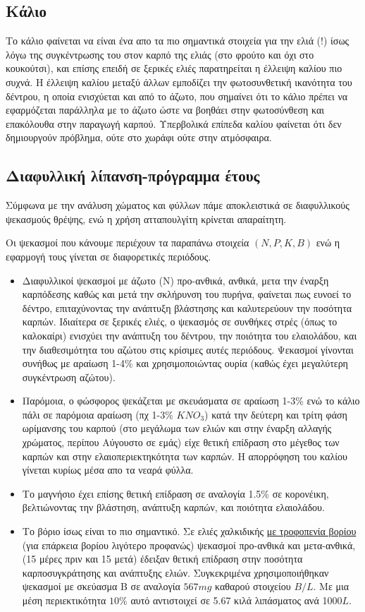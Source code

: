 \documentclass[12pt,a4paper]{article}
\begin{document}
\subsection{Κάλιο}
Το κάλιο φαίνεται να είναι ένα απο τα πιο σημαντικά στοιχεία για την ελιά (!) ίσως λόγω της συγκέντρωσης του στον καρπό της ελιάς (στο φρούτο και όχι στο κουκούτσι), και επίσης επειδή σε ξερικές ελιές παρατηρείται η έλλειψη καλίου πιο συχνά. Η έλλειψη καλίου μεταξύ άλλων εμποδίζει την φωτοσυνθετική ικανότητα του δέντρου, η οποία ενισχύεται και από το άζωτο, που σημαίνει ότι το κάλιο πρέπει να εφαρμόζεται παράλληλα με το άζωτο ώστε να βοηθάει στην φωτοσύνθεση και επακόλουθα στην παραγωγή καρπού. Υπερβολικά επίπεδα καλίου φαίνεται ότι δεν δημιουργούν πρόβλημα, ούτε στο χωράφι ούτε στην ατμόσφαιρα.     


\subsection{Διαφυλλική λίπανση-πρόγραμμα έτους}
Σύμφωνα με την ανάλυση χώματος και φύλλων πάμε αποκλειστικά σε διαφυλλικούς ψεκασμούς θρέψης, ενώ η χρήση ατταπουλγίτη κρίνεται απαραίτητη. 

Οι ψεκασμοί που κάνουμε περιέχουν τα παραπάνω στοιχεία $(Ν, P, K, B)$ ενώ η εφαρμογή τους γίνεται σε διαφορετικές περιόδους.


\begin{itemize}
	\item  Διαφυλλικοί ψεκασμοί με άζωτο (Ν) προ-ανθικά, ανθικά, μετα την έναρξη καρπόδεσης καθώς και μετά την σκλήρυνση του πυρήνα, φαίνεται πως ευνοεί το δέντρο, επιταχύνοντας την ανάπτυξη βλάστησης και καλυτερεύουν την ποσότητα καρπών. Ιδιαίτερα σε ξερικές ελιές, ο ψεκασμός σε συνθήκες στρές (όπως το καλοκαίρι) ενισχύει την ανάπτυξη του δέντρου, την ποιότητα του ελαιολάδου, και την διαθεσιμότητα του αζώτου στις κρίσιμες αυτές περιόδους. Ψεκασμοί γίνονται συνήθως με αραίωση 1-4\% και χρησιμοποιώντας ουρία (καθώς έχει μεγαλύτερη συγκέντρωση αζώτου).
	\item Παρόμοια, ο φώσφορος ψεκάζεται με σκευάσματα σε αραίωση 1-3\% ενώ το κάλιο πάλι σε παρόμοια αραίωση (πχ 1-3\% $KNO_3$) κατά την δεύτερη και τρίτη φάση ωρίμανσης του καρπού (στο μεγάλωμα των ελιών και στην έναρξη αλλαγής χρώματος, περίπου Αύγουστο σε εμάς) είχε θετική επίδραση στο μέγεθος των καρπών και στην ελαιοπεριεκτηκότητα των καρπών. Η απορρόφηση του καλίου γίνεται κυρίως μέσα απο τα νεαρά φύλλα. 
	\item  Το μαγνήσιο έχει επίσης θετική επίδραση σε αναλογία 1.5\% σε κορονέικη, βελτιώνοντας την βλάστηση, ανάπτυξη καρπών, και ποιότητα ελαιολάδου.
	\item Το βόριο ίσως είναι το πιο σημαντικό. Σε ελιές χαλκιδικής \underline{με τροφοπενία βορίου} (για επάρκεια βορίου λιγότερο προφανώς) ψεκασμοί προ-ανθικά και μετα-ανθικά, (15 μέρες πριν και 15 μετά) έδειξαν θετική επίδραση στην ποσότητα καρποσυγκράτησης και ανάπτυξης ελιών. Συγκεκριμένα χρησιμοποιήθηκαν ψεκασμοί με σκεύασμα Β σε αναλογία $567mg$ καθαρού στοιχείου $B/L$. Με μια μέση περιεκτικότητα $10\%$ αυτό αντιστοιχεί σε 5.67 κιλά λιπάσματος ανά 1000$L$.
 
\end{itemize}
\end{document}
